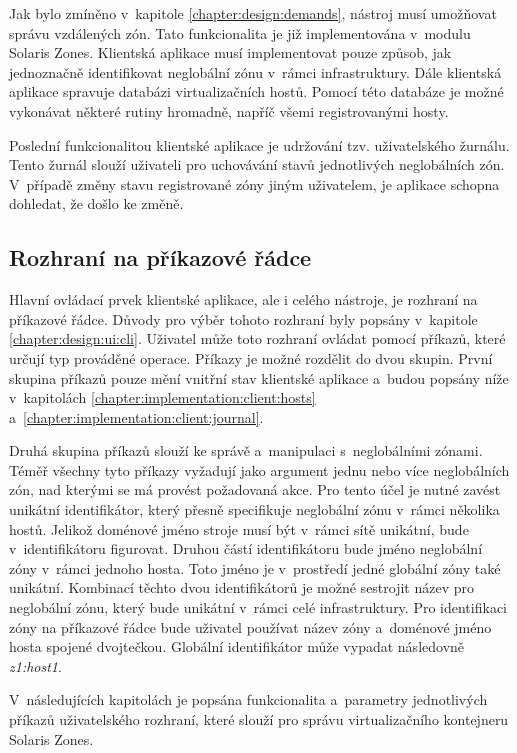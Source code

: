 Jak bylo zmíněno v~kapitole \ref{chapter:design:demands}, nástroj musí umožňovat správu vzdálených zón. Tato funkcionalita
je již implementována v~modulu Solaris Zones. Klientská aplikace musí implementovat pouze způsob, jak jednoznačně identifikovat
neglobální zónu v~rámci infrastruktury. Dále klientská aplikace spravuje databázi virtualizačních hostů. Pomocí této databáze
je možné vykonávat některé rutiny hromadně, napříč všemi registrovanými hosty.

Poslední funkcionalitou klientské aplikace je udržování tzv. uživatelského žurnálu. Tento žurnál slouží uživateli pro uchovávání
stavů jednotlivých neglobálních zón. V~případě změny stavu registrované zóny jiným uživatelem, je aplikace schopna dohledat,
že došlo ke změně.
\subsection{Rozhraní na příkazové řádce}
\label{chapter:implementation:client:cli}
Hlavní ovládací prvek klientské aplikace, ale i celého nástroje, je rozhraní na příkazové řádce. Důvody pro výběr tohoto rozhraní
byly popsány v~kapitole \ref{chapter:design:ui:cli}. Uživatel může toto rozhraní ovládat pomocí příkazů, které určují typ 
prováděné operace. Příkazy je možné rozdělit do dvou skupin. První skupina příkazů pouze mění vnitřní stav klientské aplikace a~budou
popsány níže v~kapitolách \ref{chapter:implementation:client:hosts} a~\ref{chapter:implementation:client:journal}.

Druhá skupina příkazů slouží ke správě a~manipulaci s~neglobálními zónami. Téměř všechny tyto příkazy vyžadují jako argument jednu
nebo více neglobálních zón, nad kterými se má provést požadovaná akce. Pro tento účel je nutné zavést unikátní identifikátor,
který přesně specifikuje neglobální zónu v~rámci několika hostů. Jelikož doménové jméno stroje musí být v~rámci sítě
unikátní, bude v~identifikátoru figurovat. Druhou částí identifikátoru bude jméno neglobální zóny v~rámci jednoho hosta.
Toto jméno je v~prostředí jedné globální zóny také unikátní. Kombinací těchto dvou identifikátorů je možné sestrojit název
pro neglobální zónu, který bude unikátní v~rámci celé infrastruktury. Pro identifikaci zóny na příkazové řádce bude uživatel
používat název zóny a~doménové jméno hosta spojené dvojtečkou. Globální identifikátor může vypadat následovně \textit{z1:host1}.

V~následujících kapitolách je popsána funkcionalita a~parametry jednotlivých příkazů uživatelského rozhraní, které slouží
pro správu virtualizačního kontejneru Solaris Zones.
